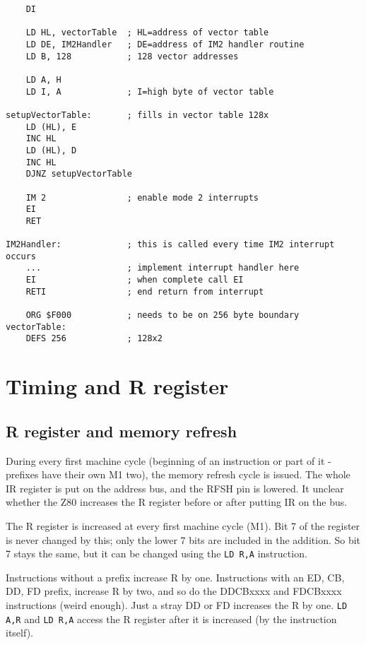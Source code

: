 \documentclass[twoside,openright,a4paper]{book}
\begin{document}
\begin{Verbatim}
	DI
	
	LD HL, vectorTable  ; HL=address of vector table
	LD DE, IM2Handler   ; DE=address of IM2 handler routine
	LD B, 128           ; 128 vector addresses

	LD A, H
	LD I, A             ; I=high byte of vector table

setupVectorTable:       ; fills in vector table 128x
	LD (HL), E
	INC HL
	LD (HL), D
	INC HL
	DJNZ setupVectorTable 

	IM 2                ; enable mode 2 interrupts
	EI
	RET

IM2Handler:             ; this is called every time IM2 interrupt occurs
	...                 ; implement interrupt handler here
	EI                  ; when complete call EI
	RETI                ; end return from interrupt

	ORG $F000           ; needs to be on 256 byte boundary
vectorTable:
	DEFS 256            ; 128x2
\end{Verbatim}

\pagebreak
\section{Timing and R register}

\subsection{R register and memory refresh}

During every first machine cycle (beginning of an instruction or part of it - prefixes have their own M1 two), the memory refresh cycle is issued. The whole IR register is put on the address bus, and the RFSH pin is lowered.  It unclear whether the Z80 increases the R register before or after putting IR on the bus. 

The R register is increased at every first machine cycle (M1). Bit 7 of the register is never changed by this; only the lower 7 bits are included in the addition. So bit 7 stays the same, but it can be changed using the
{\tt LD R,A} instruction.

Instructions without a prefix increase R by one. Instructions with an ED, CB, DD, FD prefix, increase R by two, and so do the DDCBxxxx and FDCBxxxx instructions (weird enough). Just a stray DD or FD increases the R by one. {\tt LD A,R} and {\tt LD R,A} access the R register after it is increased (by the instruction itself). 
\end{document}
